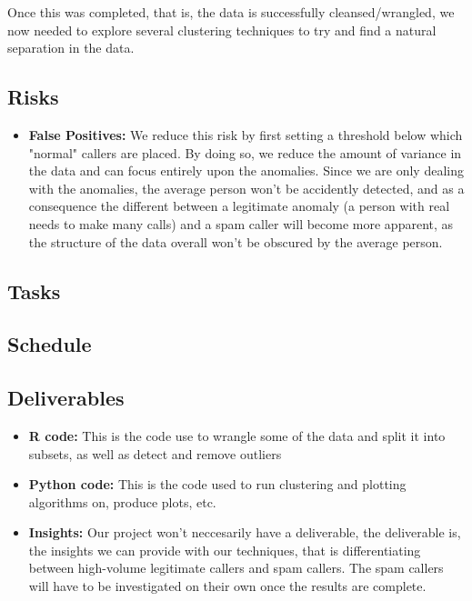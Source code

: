 \documentclass[20pt]{article} %
\begin{document}
Once this was completed, that is, the data is successfully cleansed/wrangled, we now needed to explore several clustering techniques to try and find a natural separation in the data.

\subsection{Risks}
\begin{itemize}
\item \textbf{False Positives:} We reduce this risk by first setting a threshold below which "normal" callers are placed.  By doing so, we reduce the amount of variance in the data and can focus entirely upon the anomalies.  Since we are only dealing with the anomalies, the average person won't be accidently detected, and as a consequence the different between a legitimate anomaly (a person with real needs to make many calls) and a spam caller will become more apparent, as the structure of the data overall won't be obscured by the average person.
\end{itemize}
\subsection{Tasks}

\subsection{Schedule}

\subsection{Deliverables}
\begin{itemize}
\item \textbf{R code:} This is the code use to wrangle some of the data and split it into subsets, as well as detect and remove outliers
\item \textbf{Python code:} This is the code used to run clustering and plotting algorithms on, produce plots, etc.
\item \textbf{Insights:} Our project won't neccesarily have a deliverable, the deliverable is, the insights we can provide with our techniques, that is differentiating between high-volume legitimate callers and spam callers.  The spam callers will have to be investigated on their own once the results are complete.
\end{itemize}
\end{document}
